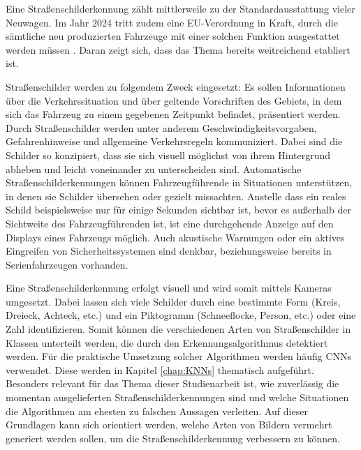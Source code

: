 \label{chap:stand-der-technik-strassenschilderkennung}
Eine Straßenschilderkennung zählt mittlerweile zu der Standardausstattung vieler Neuwagen. Im Jahr 2024 tritt zudem eine EU-Verordnung in Kraft, durch die sämtliche neu produzierten Fahrzeuge mit einer solchen Funktion ausgestattet werden müssen \cite{eu-regulation}. Daran zeigt sich, dass das Thema bereits weitreichend etabliert ist.

Straßenschilder werden zu folgendem Zweck eingesetzt: Es sollen Informationen über die Verkehrssituation und über geltende Vorschriften des Gebiets, in dem sich das Fahrzeug zu einem gegebenen Zeitpunkt befindet, präsentiert werden. Durch Straßenschilder werden unter anderem Geschwindigkeitsvorgaben, Gefahrenhinweise und allgemeine Verkehrsregeln kommuniziert. Dabei sind die Schilder so konzipiert, dass sie sich visuell möglichst von ihrem Hintergrund abheben und leicht voneinander zu unterscheiden sind. Automatische Straßenschilderkennungen können Fahrzeugführende in Situationen unterstützen, in denen sie Schilder übersehen oder gezielt missachten. Anstelle dass ein reales Schild beispielsweise nur für einige Sekunden sichtbar ist, bevor es außerhalb der Sichtweite des Fahrzeugführenden ist, ist eine durchgehende Anzeige auf den Displays eines Fahrzeugs möglich. Auch akustische Warnungen oder ein aktives Eingreifen von Sicherheitssystemen sind denkbar, beziehungsweise bereits in Serienfahrzeugen vorhanden. \cite{traffic-sign-detection-review-2014}

Eine Straßenschilderkennung erfolgt visuell und wird somit mittels Kameras umgesetzt. Dabei lassen sich viele Schilder durch eine bestimmte Form (Kreis, Dreieck, Achteck, etc.) und ein Piktogramm (Schneeflocke, Person, etc.) oder eine Zahl identifizieren. Somit können die verschiedenen Arten von Straßenschilder in Klassen unterteilt werden, die durch den Erkennungsalgorithmus detektiert werden. Für die praktische Umsetzung solcher Algorithmen werden häufig \acp{CNN} verwendet. Diese werden in Kapitel \ref{chap:KNNs} thematisch aufgeführt. Besonders relevant für das Thema dieser Studienarbeit ist, wie zuverlässig die momentan ausgelieferten Straßenschilderkennungen sind und welche Situationen die Algorithmen am ehesten zu falschen Aussagen verleiten. Auf dieser Grundlagen kann sich orientiert werden, welche Arten von Bildern vermehrt generiert werden sollen, um die Straßenschilderkennung verbessern zu können. \cite{traffic-sign-detection-review-2014}

